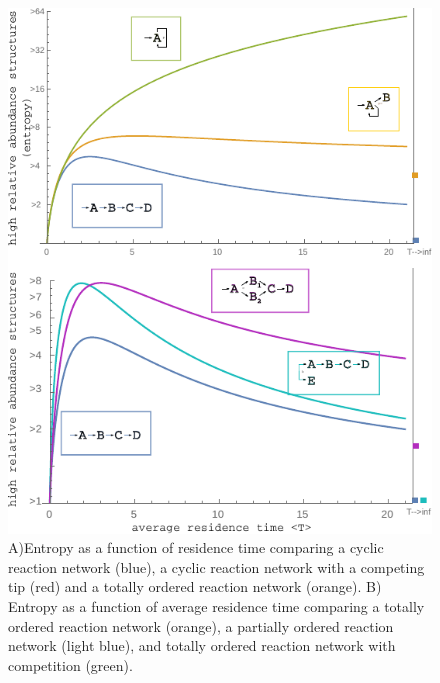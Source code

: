 \documentclass{article}
\begin{document}
\begin{figure}[h]
    \includegraphics[width=\textwidth]{Figure_3.pdf}
	\caption{A)Entropy as a function of residence time comparing a cyclic reaction network (blue), a cyclic reaction network with a competing tip (red) and a totally ordered reaction network (orange). B) Entropy as a function of average residence time comparing a totally ordered reaction network (orange), a partially ordered reaction network (light blue), and totally ordered reaction network with competition (green).}
\end{figure}
\end{document}
